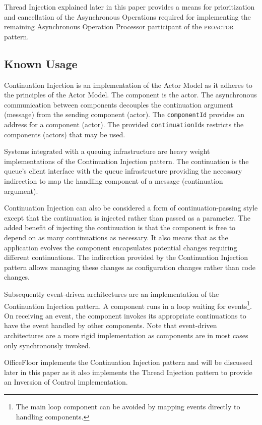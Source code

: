 \documentclass[prodmode]{style/acmlarge}
\begin{document}
Thread Injection explained later in this paper provides a means for
prioritization and cancellation of the Asynchronous Operations required for
implementing the remaining Asynchronous Operation Processor participant of the
\textsc{proactor} pattern.


\subsection{Known Usage}

Continuation Injection is an implementation of the Actor Model \cite{actors} as
it adheres to the principles of the Actor Model.  The component is the actor.
The asynchronous communication between components decouples the continuation
argument (message) from the sending component (actor).  The \texttt{componentId}
provides an address for a component (actor).  The provided
\texttt{continuationId}s restricts the components (actors) that may be used.

Systems integrated with a queuing infrastructure are heavy weight
implementations of the Continuation Injection pattern.  The continuation is the
queue's client interface with the queue infrastructure providing the necessary
indirection to map the handling component of a message (continuation argument).

Continuation Injection can also be considered a form of continuation-passing
style \cite{continuations} except that the continuation is injected rather than
passed as a parameter.  The added benefit of injecting the continuation is that
the component is free to depend on as many continuations as necessary.  It also
means that as the application evolves the component encapsulates potential
changes requiring different continuations.  The indirection provided by the
Continuation Injection pattern allows managing these changes as configuration
changes rather than code changes.

Subsequently event-driven architectures are an implementation of the
Continuation Injection pattern.  A component runs in a loop waiting for
events\footnote{The main loop component can be avoided by mapping events
directly to handling components.}.  On receiving an event, the component invokes
its appropriate continuations to have the event handled by other components. 
Note that event-driven architectures are a more rigid implementation as
components are in most cases only synchronously invoked.

OfficeFloor \cite{officefloor} implements the Continuation Injection pattern and
will be discussed later in this paper as it also implements the Thread Injection
pattern to provide an Inversion of Control implementation.
\end{document}
